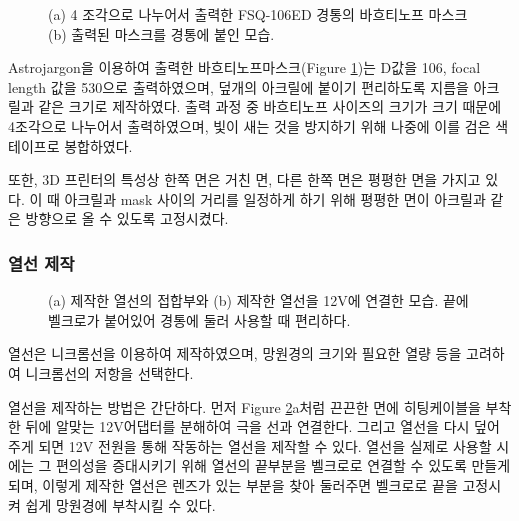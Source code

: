 \begin{figure}[ht]
	\begin{center}
	\end{center}
	\caption{(a) 4 조각으로 나누어서 출력한 FSQ-106ED 경통의 바흐티노프 마스크 (b) 출력된 마스크를 경통에 붙인 모습.}
	\label{mask}
\end{figure}

Astrojargon을 이용하여 출력한 바흐티노프마스크(\textrm{Figure} \ref{mask})는 D값을 106, focal length 값을 530으로 출력하였으며, 덮개의 아크릴에 붙이기 편리하도록 지름을 아크릴과 같은 크기로 제작하였다. 출력 과정 중 바흐티노프 사이즈의 크기가 크기 때문에 4조각으로 나누어서 출력하였으며, 빛이 새는 것을 방지하기 위해 나중에 이를 검은 색 테이프로 봉합하였다. 

또한, 3D 프린터의 특성상 한쪽 면은 거친 면, 다른 한쪽 면은 평평한 면을 가지고 있다. 이 때 아크릴과 mask 사이의 거리를 일정하게 하기 위해 평평한 면이 아크릴과 같은 방향으로 올 수 있도록 고정시켰다.

\subsubsection{열선 제작}
\begin{figure}[h]
	\begin{center}
	\end{center}
	\caption{(a) 제작한 열선의 접합부와 (b) 제작한 열선을 12V에 연결한 모습. 끝에 벨크로가 붙어있어 경통에 둘러 사용할 때 편리하다.}
	\label{thermic}
\end{figure}

열선은  니크롬선을 이용하여 제작하였으며, 망원경의 크기와 필요한 열량 등을 고려하여 니크롬선의 저항을 선택한다.

열선을 제작하는 방법은 간단하다. 먼저 \textrm{Figure} \ref{thermic}a처럼 끈끈한 면에 히팅케이블을 부착한 뒤에 알맞는 12V어댑터를 분해하여 극을 선과 연결한다. 그리고 열선을 다시 덮어주게 되면 12V 전원을 통해 작동하는 열선을 제작할 수 있다. 열선을 실제로 사용할 시에는 그 편의성을 증대시키기 위해 열선의 끝부분을 벨크로로 연결할 수 있도록 만들게 되며, 이렇게 제작한 열선은 렌즈가 있는 부분을 찾아 둘러주면 벨크로로 끝을 고정시켜 쉽게 망원경에 부착시킬 수 있다.

